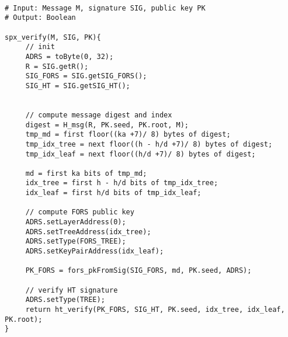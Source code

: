 \begin{lstlisting}[breaklines=true, label=alg:spx:ver, mathescape, language=pseudoc,
                   caption=\spxverify\ -- Verify a \spx signature \spxsig on a
   message \msg using a \spx public key \PK]

# Input: Message M, signature SIG, public key PK
# Output: Boolean

spx_verify(M, SIG, PK){
     // init
     ADRS = toByte(0, 32);
     R = SIG.getR();
     SIG_FORS = SIG.getSIG_FORS();
     SIG_HT = SIG.getSIG_HT();


     // compute message digest and index
     digest = H_msg(R, PK.seed, PK.root, M);
     tmp_md = first floor((ka +7)/ 8) bytes of digest;
     tmp_idx_tree = next floor((h - h/d +7)/ 8) bytes of digest;
     tmp_idx_leaf = next floor((h/d +7)/ 8) bytes of digest;

     md = first ka bits of tmp_md;
     idx_tree = first h - h/d bits of tmp_idx_tree;
     idx_leaf = first h/d bits of tmp_idx_leaf;

     // compute FORS public key
     ADRS.setLayerAddress(0);
     ADRS.setTreeAddress(idx_tree);
     ADRS.setType(FORS_TREE);
     ADRS.setKeyPairAddress(idx_leaf);

     PK_FORS = fors_pkFromSig(SIG_FORS, md, PK.seed, ADRS);

     // verify HT signature
     ADRS.setType(TREE);
     return ht_verify(PK_FORS, SIG_HT, PK.seed, idx_tree, idx_leaf, PK.root);
}
\end{lstlisting}

